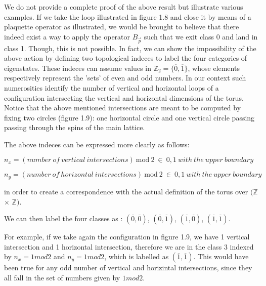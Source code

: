 \documentclass{Configuration_Files/PoliMi3i_thesis}
\begin{document}
We do not provide a complete proof of the above result but illustrate various examples.
If we take the loop illustrated in figure 1.8 and close it by means of a plaquette operator as illustrated, we would be brought to believe that there indeed exist a way to apply the operator $B_{\vec{p}} $ such that we exit class 0 and land in class 1. Though, this is not possible. \newline
In fact, we can show the impossibility of the above action by defining two topological indeces to label the four categories of eigenstates. These indeces can assume values in $\mathbb{Z}_2=\{\overline{0},\overline{1} \}$, whose elements respectively represent the 'sets' of even and odd numbers. In our context such numerosities identify the number of vertical and horizontal loops of a configuration intersecting the vertical and horizontal dimensions of the torus. Notice that the above mentioned intersections are meant to be computed by fixing two circles (figure 1.9): one horizontal circle and one vertical circle passing passing through the spins of the main lattice.

The above indeces can be expressed more clearly as follows: 

\begin{center}
	$n_x= (number \ of \ vertical \ intersections) \ \mathrm{mod} \ 2 \ \in \ {0,1} \ with \ the \ upper \ boundary$
\end{center}
\begin{center}
	$n_y= (number \ of \ horizontal \ intersections) \ \mathrm{mod} \ 2 \ \in \ {0,1} \ with \ the \ upper \ boundary$
\end{center}


in order to create a correspondence with the actual definition of the torus over $(\mathbb{Z}$ $\times$ $\mathbb{Z})$. 

We can then label the four classes as : $(\overline{0},\overline{0} )$, $(\overline{0},\overline{1} )$, $(\overline{1},\overline{0})$, $(\overline{1},\overline{1})$.\newline

For example, if we take again the configuration in figure 1.9, we have 1 vertical intersection and 1 horizontal intersection, therefore we are in the class 3 indexed by $n_x=1mod2$ and $n_y=1mod2$, which is labelled as $(\overline{1},\overline{1})$. This would have been true for any odd number of vertical and horizintal intersections, since they all fall in the set of numbers given by $1mod2$.
\end{document}
